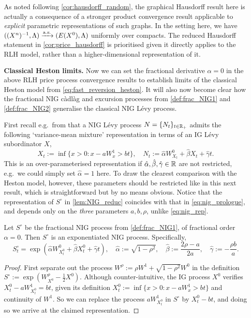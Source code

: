 As noted following \autoref{cor:hausdorff_random}, the graphical Hausdorff result here is actually a consequence of a stronger product convergence result applicable to \emph{explicit} parametric representations of such graphs. In the setting here, we have $((X^n)^{-1},\Lambda)\xrightarrow{\mathrm{a.s.}}(E(X^0),\Lambda)$ uniformly over compacts. The reduced Hausdorff statement in \autoref{cor:price_hausdorff} is prioritised given it directly applies to the RLH model, rather than a higher-dimensional representation of it.

\vspace{3mm}\textbf{Classical Heston limits.} Now we can set the fractional derivative $\alpha=0$ in the above RLH price process convergence results to establish limits of the classical Heston model from \autoref{eq:fast_reversion_heston}. It will also now become clear how the fractional NIG c\`adl\`ag and excursion processes from \autoref{def:frac_NIG1} and \autoref{def:frac_NIG2} generalise the classical NIG L\'evy process.

First recall e.g.~from \cite{applebaum_2009} that a NIG L\'evy process $N=\{N_t\}_{t\in\mathbb{R}_+}$ admits the following `variance-mean mixture' representation in terms of an IG L\'evy subordinator $X$,
\begin{equation}\label{eq:nig_rep}
    X_t:= \inf\big\{x>0:x-a W^1_x > bt\big\},\quad N_t:= \hat\alpha W^0_{X_t} + \hat\beta X_t + \hat\gamma t.
\end{equation}
This is an over-parameterised representation if $\hat\alpha, \hat\beta, \hat\gamma\in\mathbb{R}$ are not restricted, e.g.~we could simply set $\hat\alpha=1$ here. To draw the clearest comparison with the Heston model, however, these parameters should be restricted like in this next result, which is straightforward but by no means obvious. Notice that the representation of $S^\circ$ in \autoref{lem:NIG_reduc} coincides with that in \autoref{eq:nig_prologue}, and depends only on the \emph{three} parameters $a,b,\rho$, unlike \autoref{eq:nig_rep}.

\begin{lemma}\label{lem:NIG_reduc}
    Let $S^\circ$ be the fractional NIG process from \autoref{def:frac_NIG1}, of fractional order $\alpha=0$. Then $S^\circ$ is an exponentiated NIG process. Specifically,~
    \begin{equation}
        S^\circ_t=\exp\left(\hat\alpha W^0_{X^0_t} + \hat\beta X^0_t + \hat\gamma t\right),\quad \hat\alpha:=\sqrt{1-\rho^2},\quad \hat\beta:=\frac{2\rho-a}{2a},\quad \hat\gamma:=-\frac{\rho b}{a}.
    \end{equation}
\end{lemma}
\begin{proof}
    First separate out the process $W^\rho:=\rho W^1+\sqrt{1-\rho^2}W^0$ in the definition $S^\circ:=\exp(W^\rho_{X^0}-\frac12 X^0)$. Although counter-intuitive, the IG process $X^0$ verifies $X^0_t-aW^1_{X^0_t}=bt$, given its definition $X^0_t:=\inf\{x>0:x-a W^1_x>bt\}$ and continuity of $W^1$. So we can replace the process $aW^1_{X^0_t}$ in $S^\circ$ by $X^0_t-bt$, and doing so we arrive at the claimed representation.
\end{proof}

